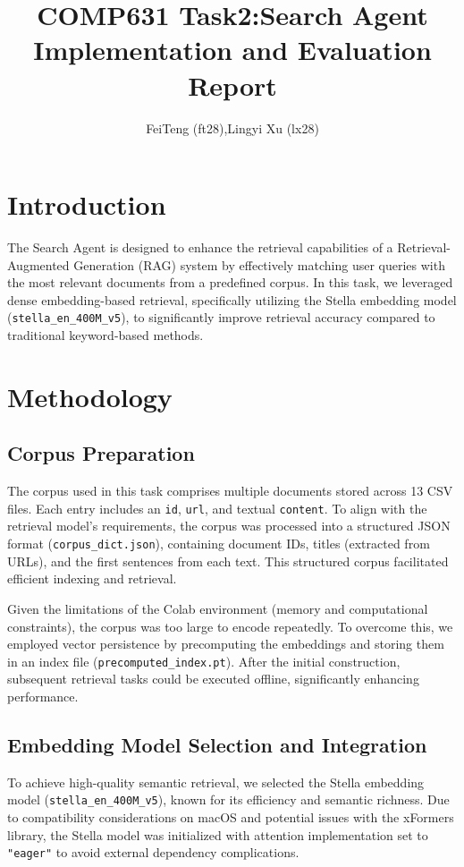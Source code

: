 \documentclass{article}
\title{COMP631 Task2:Search Agent Implementation and Evaluation Report}
\author{FeiTeng (ft28),Lingyi Xu (lx28)}
\begin{document}
\maketitle

\section{Introduction}

The Search Agent is designed to enhance the retrieval capabilities of a Retrieval-Augmented Generation (RAG) system by effectively matching user queries with the most relevant documents from a predefined corpus. In this task, we leveraged dense embedding-based retrieval, specifically utilizing the Stella embedding model (\texttt{stella\_en\_400M\_v5}), to significantly improve retrieval accuracy compared to traditional keyword-based methods.

\section{Methodology}

\subsection{Corpus Preparation}

The corpus used in this task comprises multiple documents stored across 13 CSV files. Each entry includes an \texttt{id}, \texttt{url}, and textual \texttt{content}. To align with the retrieval model's requirements, the corpus was processed into a structured JSON format (\texttt{corpus\_dict.json}), containing document IDs, titles (extracted from URLs), and the first sentences from each text. This structured corpus facilitated efficient indexing and retrieval.

Given the limitations of the Colab environment (memory and computational constraints), the corpus was too large to encode repeatedly. To overcome this, we employed vector persistence by precomputing the embeddings and storing them in an index file (\texttt{precomputed\_index.pt}). After the initial construction, subsequent retrieval tasks could be executed offline, significantly enhancing performance.

\subsection{Embedding Model Selection and Integration}

To achieve high-quality semantic retrieval, we selected the Stella embedding model (\texttt{stella\_en\_400M\_v5}), known for its efficiency and semantic richness. Due to compatibility considerations on macOS and potential issues with the xFormers library, the Stella model was initialized with attention implementation set to \texttt{"eager"} to avoid external dependency complications.
\end{document}
